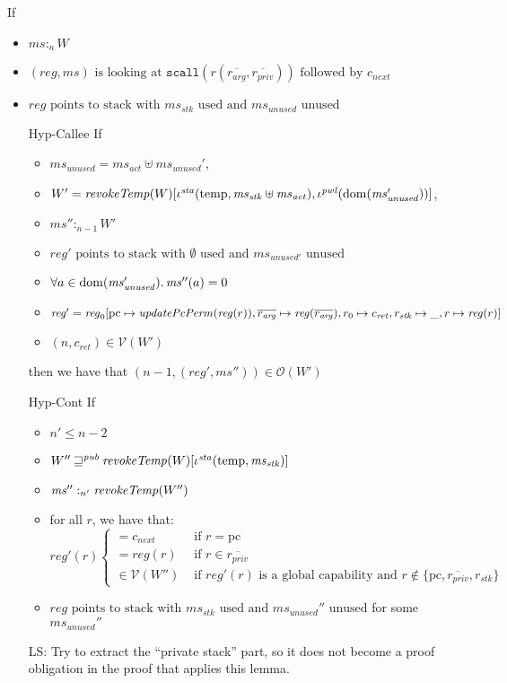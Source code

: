 \documentclass[a4paper]{article}
\DeclareMathOperator{\dom}{dom}
\newcommand\lau[1]{{\color{purple} \sf \footnotesize {LS: #1}}\\}
\newcommand{\var}[1]{\mathit{#1}}
\newcommand{\hs}{\var{ms}}
\newcommand{\ms}{\hs}
\newcommand{\pcreg}{\mathrm{pc}}
\newcommand{\reg}{\var{reg}}
\newcommand{\heap}{\var{mem}}
\newcommand{\stk}{\var{stk}}
\newcommand{\pwl}{\var{pwl}}
\newcommand{\sta}{\var{sta}}
\newcommand{\plainfun}[2]{
  \ifthenelse{\equal{#2}{}}
  {\mathit{#1}}
  {\mathit{#1}(#2)}
}
\newcommand{\updatePcPerm}[1]{\plainfun{updatePcPerm}{#1}}
\newcommand{\revokeTemp}[1]{\plainfun{revokeTemp}{#1}}
\newcommand{\futurewk}{\mathbin{\sqsupseteq}^{\var{pub}}}
\newcommand{\heapSat}[3][\heap]{#1 :_{#2} #3}
\newcommand{\memSat}[3][n]{\heapSat[#2]{#1}{#3}}
\newcommand{\asmType}{\plaindom{AsmType}}
\newcommand{\plaindom}[1]{\mathrm{#1}}
\newcommand{\intr}[2]{\mathcal{#1}}
\newcommand{\valueintr}[1]{\intr{V}{#1}}
\newcommand{\stdvr}{\valueintr{\asmType}}
\newcommand{\observations}{\mathcal{O}}
\newcommand{\plainview}[1]{\mathrm{#1}}
\newcommand{\temp}{\plainview{temp}}
\begin{document}
\begin{lemma}
\begin{lemma}
  If
  \begin{itemize}
  \item $\heapSat[\ms]{n}{W}$ 
  \item $(\reg,\ms) \text{ is looking at }
    \mathtt{scall}(r(\overline{r_{\mathit{arg}}},
    \overline{r_{\mathit{priv}}})) \text{ followed by } c_{\mathit{next}}$
  \item $\reg \text{ points to stack with $\ms_\stk$ used and $\ms_{\mathit{unused}}$ unused}$
  \item[Hyp-Callee] If
    \begin{itemize}
    \item $\ms_{\mathit{unused}} = \ms_{\mathit{act}}
      \uplus \ms_{\mathit{unused}}'$,
    \item $W' =
      \revokeTemp{W}[\iota^{\sta}(\temp,\ms_\stk\uplus\ms_{\mathit{act}}),\iota^{\pwl}(\dom(\ms_{\mathit{unused}}'))]$,
    \item $\memSat[n-1]{\ms''}{W'}$
    \item $\reg' \text{ points to stack with $\emptyset$ used and $\ms_{\mathit{unused}'}$ unused}$
    \item $\forall a \in \dom(\ms_{\var{unused}}') \ldotp \ms''(a) = 0$
    \item $\reg'= \reg_0[\pcreg\mapsto\updatePcPerm{\reg(r)},
      \overline{r_{\mathit{arg}}} \mapsto \reg(\overline{r_{\mathit{arg}}}),r_0
      \mapsto c_{\mathit{ret}}, r_\stk \mapsto \_, r \mapsto \reg(r)]$ 
    \item $(n,c_{\mathit{ret}}) \in \stdvr(W')$
    \end{itemize}
    then we have that $(n-1,(\reg',\ms'')) \in \observations(W')$
  \item[Hyp-Cont] If
    \begin{itemize}
    \item $n' \leq n-2$
    \item $W'' \futurewk \revokeTemp{W}[\iota^{\sta}(\temp,\ms_\stk)]$
    \item $\memSat[n']{\ms''}{\revokeTemp{W''}}$ 
    \item for all $r$, we have that:
      \begin{equation*}
        \reg'(r)
        \begin{cases}
          = c_{\mathit{next}} &\text{ if } r = \pcreg\\
          = \reg(r)&\text{ if } r \in \overline{r_{\mathit{priv}}}\\
          \in \stdvr(W'') &\text{ if $\reg'(r)$ is a global capability and } r \not\in \{\pcreg,\overline{r_{\mathit{priv}}}, r_\stk\} %
        \end{cases}
      \end{equation*}
    \item $\reg \text{ points to stack with $\ms_\stk$ used and $\ms_{\mathit{unused}}''$ unused}$ for some $\ms_{\mathit{unused}}''$
    \end{itemize}
\lau{Try to extract the ``private stack'' part, so it does not become a proof obligation in the proof that applies this lemma.}


\end{itemize}
\end{lemma}
\end{lemma}
\end{document}
